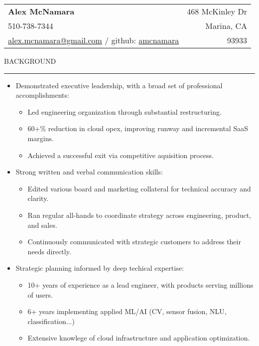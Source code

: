 \documentclass[12pt]{article}
\makeatletter
\newenvironment{justifycolumns}
{\begin{tabular*}{\textwidth}{@{\extracolsep{\fill}}lr@{}}}
{\end{tabular*}}
\newcommand{\row}[2]{#1 & #2 \\}
\newcommand{\blockseparation}{\vspace{0.15in}}
\newcommand{\heading}[1]{
	\blockseparation
	\uppercase{#1}
	\vspace{0.05in}
	\hrule
	\blockseparation
}
\newenvironment{tightbullets}
{\begin{itemize}}
{\end{itemize}}
\newenvironment{bullets}
{\begin{tightbullets}}
{\end{tightbullets} \blockseparation}
\makeatother
\begin{document}
\begin{flushleft}

\begin{justifycolumns}
	\row{\Large\textbf{Alex McNamara}}{468 McKinley Dr}
	\row{510-738-7344}{Marina, CA}
	\row{
		\href{mailto:alex.mcnamara@gmail.com}{alex.mcnamara@gmail.com} / github: 
		\href{http://www.github.com/amcnamara}{amcnamara}
	}{93933}
\end{justifycolumns}

\blockseparation


\heading{Background}

\begin{bullets}
	\item Demonstrated executive leadership, with a broad set of professional accomplishments:

	\begin{tightbullets}
		\item Led engineering organization through substantial restructuring.
		\item 60+\% reduction in cloud opex, improving runway and incremental SaaS margins.
		\item Achieved a successful exit via competitive aquisition process.
	\end{tightbullets}

	\item Strong written and verbal communication skills:

	\begin{tightbullets}
		\item Edited various board and marketing collateral for technical accuracy and clarity.
		\item Ran regular all-hands to coordinate strategy across engineering, product, and sales.
		\item Continuously communicated with strategic customers to address their needs directly.
	\end{tightbullets}

	\item Strategic planning informed by deep techical expertise:

	\begin{tightbullets}
		\item 10+ years of experience as a lead engineer, with products serving millions of users.
		\item 6+ years implementing applied ML/AI (CV, sensor fusion, NLU, classification...)
		\item Extensive knowlege of cloud infrastructure and application optimization.
	\end{tightbullets}
\end{bullets}


\end{flushleft}
\end{document}
